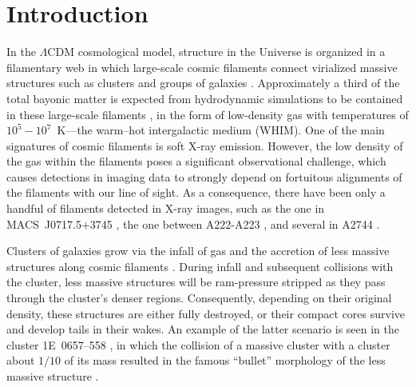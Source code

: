 \section{Introduction}

In the $\Lambda$CDM cosmological model, structure in the Universe is organized in a filamentary web in which large-scale cosmic filaments connect virialized massive structures such as clusters and groups of galaxies \citep[e.g., ][]{Einasto1994}. Approximately a third of the total bayonic matter is expected from hydrodynamic simulations to be contained in these large-scale filaments \citep[e.g.][]{Dave2001}, in the form of low-density gas with temperatures of $10^5-10^7$~K---the warm--hot intergalactic medium (WHIM). One of the main signatures of cosmic filaments is soft X-ray emission. However, the low density of the gas within the filaments poses a significant observational challenge, which causes detections in imaging data to strongly depend on fortuitous alignments of the filaments with our line of sight. As a consequence, there have been only a handful of filaments detected in X-ray images, such as the one in MACS~J0717.5+3745 \citep{Ebeling2004}, the one between A222-A223 \citep{Dietrich2005, Werner2008, Dietrich2012}, and several in A2744 \citep{Eckert2015}.

Clusters of galaxies grow via the infall of gas and the accretion of less massive structures along cosmic filaments \citep[e.g.,][]{Springel2006}. During infall and subsequent collisions with the cluster, less massive structures will be ram-pressure stripped as they pass through the cluster's denser regions. Consequently, depending on their original density, these structures are either fully destroyed, or their compact cores survive and develop tails in their wakes. An example of the latter scenario is seen in the cluster 1E~0657--558 \citep{Elvis1992}, in which the collision of a massive cluster with a cluster about $1/10$ of its mass \citep{Springel2007, Mastropietro2008} resulted in the famous ``bullet'' morphology of the less massive structure \citep{Markevitch2002}.

